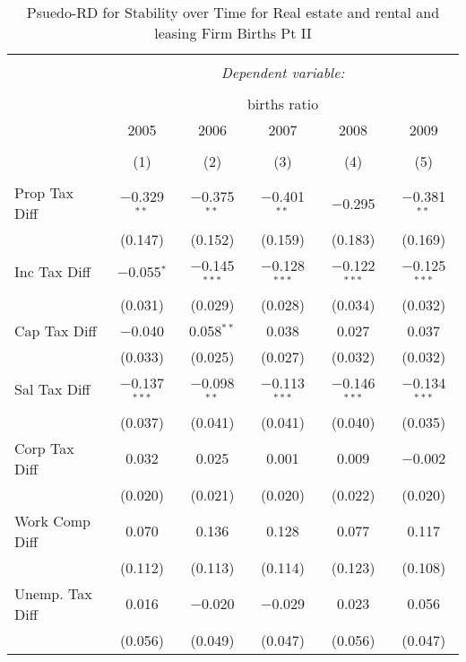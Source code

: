 
\begin{table}[!htbp] \centering 
  \caption{Psuedo-RD for Stability over Time for  Real estate and rental and leasing Firm Births Pt II} 
  \label{53year} 
\small 
\begin{tabular}{@{\extracolsep{5pt}}lccccc} 
\\[-1.8ex]\hline 
\hline \\[-1.8ex] 
 & \multicolumn{5}{c}{\textit{Dependent variable:}} \\ 
\cline{2-6} 
\\[-1.8ex] & \multicolumn{5}{c}{births ratio} \\ 
 & 2005 & 2006 & 2007 & 2008 & 2009 \\ 
\\[-1.8ex] & (1) & (2) & (3) & (4) & (5)\\ 
\hline \\[-1.8ex] 
 Prop Tax Diff & $-$0.329$^{**}$ & $-$0.375$^{**}$ & $-$0.401$^{**}$ & $-$0.295 & $-$0.381$^{**}$ \\ 
  & (0.147) & (0.152) & (0.159) & (0.183) & (0.169) \\ 
  Inc Tax Diff & $-$0.055$^{*}$ & $-$0.145$^{***}$ & $-$0.128$^{***}$ & $-$0.122$^{***}$ & $-$0.125$^{***}$ \\ 
  & (0.031) & (0.029) & (0.028) & (0.034) & (0.032) \\ 
  Cap Tax Diff & $-$0.040 & 0.058$^{**}$ & 0.038 & 0.027 & 0.037 \\ 
  & (0.033) & (0.025) & (0.027) & (0.032) & (0.032) \\ 
  Sal Tax Diff & $-$0.137$^{***}$ & $-$0.098$^{**}$ & $-$0.113$^{***}$ & $-$0.146$^{***}$ & $-$0.134$^{***}$ \\ 
  & (0.037) & (0.041) & (0.041) & (0.040) & (0.035) \\ 
  Corp Tax Diff & 0.032 & 0.025 & 0.001 & 0.009 & $-$0.002 \\ 
  & (0.020) & (0.021) & (0.020) & (0.022) & (0.020) \\ 
  Work Comp Diff & 0.070 & 0.136 & 0.128 & 0.077 & 0.117 \\ 
  & (0.112) & (0.113) & (0.114) & (0.123) & (0.108) \\ 
  Unemp. Tax Diff & 0.016 & $-$0.020 & $-$0.029 & 0.023 & 0.056 \\ 
  & (0.056) & (0.049) & (0.047) & (0.056) & (0.047) \\ 

\end{tabular}
\end{table}
